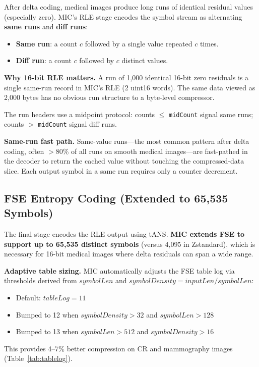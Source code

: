 \documentclass[journal]{IEEEtran}
\begin{document}
After delta coding, medical images produce long runs of identical residual
values (especially zero). MIC's RLE stage encodes the symbol stream as
alternating \textbf{same runs} and \textbf{diff runs}:
\begin{itemize}
  \item \textbf{Same run}: a count $c$ followed by a single value repeated
  $c$ times.
  \item \textbf{Diff run}: a count $c$ followed by $c$ distinct values.
\end{itemize}

\textbf{Why 16-bit RLE matters.} A run of 1,000 identical 16-bit zero residuals
is a single same-run record in MIC's RLE (2 uint16 words). The same data viewed
as 2,000 bytes has no obvious run structure to a byte-level compressor.

The run headers use a midpoint protocol: counts $\leq$ \texttt{midCount} signal
same runs; counts $>$ \texttt{midCount} signal diff runs.

\textbf{Same-run fast path.} Same-value runs---the most common pattern after
delta coding, often $>$80\% of all runs on smooth medical images---are
fast-pathed in the decoder to return the cached value without touching the
compressed-data slice. Each output symbol in a same run requires only a counter
decrement.

\subsection{FSE Entropy Coding (Extended to 65,535 Symbols)}

The final stage encodes the RLE output using tANS. \textbf{MIC extends FSE to
support up to 65,535 distinct symbols} (versus 4,095 in Zstandard), which is
necessary for 16-bit medical images where delta residuals can span a wide range.

\textbf{Adaptive table sizing.} MIC automatically adjusts the FSE table log via
thresholds derived from $\textit{symbolLen}$ and $\textit{symbolDensity} =
\textit{inputLen} / \textit{symbolLen}$:
\begin{itemize}
  \item Default: $\textit{tableLog} = 11$
  \item Bumped to 12 when $\textit{symbolDensity} > 32$ and
  $\textit{symbolLen} > 128$
  \item Bumped to 13 when $\textit{symbolLen} > 512$ and
  $\textit{symbolDensity} > 16$
\end{itemize}
This provides 4--7\% better compression on CR and mammography images
(Table~\ref{tab:tablelog}).
\end{document}
